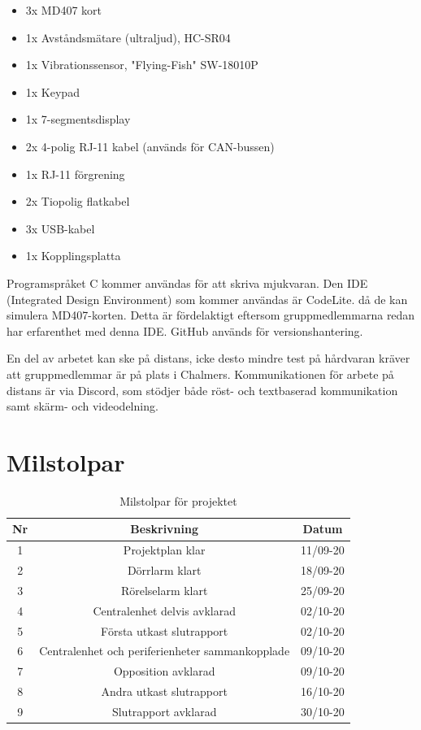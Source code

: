 \documentclass[a4paper]{article}
\begin{document}
\begin{itemize}
    \item 3x MD407 kort
    \item 1x Avståndsmätare (ultraljud), HC-SR04
    \item 1x Vibrationssensor, "Flying-Fish" SW-18010P
    \item 1x Keypad
    \item 1x 7-segmentsdisplay
    \item 2x 4-polig RJ-11 kabel (används för CAN-bussen)
    \item 1x RJ-11 förgrening
    \item 2x Tiopolig flatkabel
    \item 3x USB-kabel
    \item 1x Kopplingsplatta
\end{itemize}

Programspråket C kommer användas för att skriva mjukvaran. Den IDE (Integrated Design Environment) som kommer användas är CodeLite. då de kan simulera MD407-korten. Detta är fördelaktigt eftersom gruppmedlemmarna redan har erfarenthet med denna IDE. GitHub används för versionshantering.

En del av arbetet kan ske på distans, icke desto mindre test på hårdvaran kräver att gruppmedlemmar är på plats i Chalmers. Kommunikationen för arbete på distans är via Discord, som stödjer både röst- och textbaserad kommunikation samt skärm- och videodelning.

\section{Milstolpar}


\begin{table}[H]
    \centering
        \begin{tabular}{ |c|c|c| }\hline
            Nr & Beskrivning & Datum \\\hline\hline
            1 & Projektplan klar & 11/09-20 \\\hline
            2 & Dörrlarm klart & 18/09-20 \\\hline
            3 & Rörelselarm klart & 25/09-20 \\\hline
            4 & Centralenhet delvis avklarad & 02/10-20 \\\hline
            5 & Första utkast slutrapport & 02/10-20 \\\hline
            6 & Centralenhet och periferienheter sammankopplade & 09/10-20 \\\hline
            7 & Opposition avklarad & 09/10-20 \\\hline
            8 & Andra utkast slutrapport & 16/10-20 \\\hline
            9 & Slutrapport avklarad & 30/10-20 \\\hline
        \end{tabular}
        \caption{Milstolpar för projektet}
        \label{table:milstolpar}
\end{table}
\end{document}
